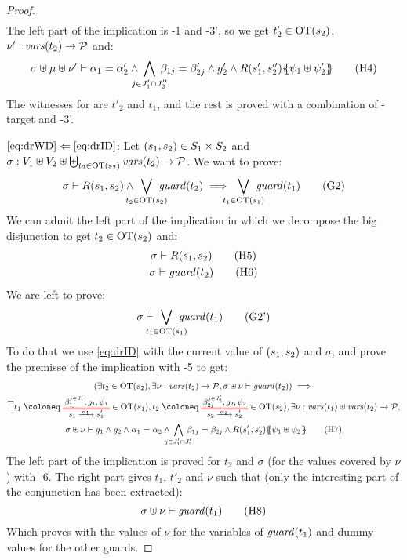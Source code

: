 \documentclass{article}
\begin{document}
\begin{proof}
\begin{multline}
	\end{multline}
	The left part of the implication is \hyp{1} and \hyp{3'}, so we get \(t'_2 \in \mathrm{OT}{\left(s_2\right)}\), \(\nu': \mathit{vars}{\left(t_2\right)} \to \mathcal{P}\) and:
	\[ \sigma \uplus \mu \uplus \nu' \vdash \alpha_1 = \alpha'_2 \wedge \bigwedge_\subbox{j \in J'_1 \cap J''_2} \beta_{1j} = \beta'_{2j} \wedge g'_2 \wedge R\mpar{s'_1, s''_2}\psubst{\psi_1 \uplus \psi'_2} \hyp{4} \]
	The witnesses for  are \(t'_2\) and \(t_1\), and the rest is proved with a combination of \hyp{target} and \hyp{3'}.
\item[\(\eqref{eq:drWD}\Leftarrow\eqref{eq:drID}\):]
	Let \({\left(s_1, s_2\right)} \in S_1 \times S_2\) and \(\sigma: V_1 \uplus V_2 \uplus \biguplus_{t_2 \in \mathrm{OT}{\left(s_2\right)}} \mathit{vars}{\left(t_2\right)} \to \mathcal{P}\).
	We want to prove:
	\[ \sigma \vdash R\mpar{s_1, s_2} \wedge \bigvee_\subbox{t_2 \in \fOT{s_2}} \fguard{t_2} \implies \bigvee_\subbox{t_1 \in \fOT{s_1}} \fguard{t_1} \goal{2} \]
	We can admit the left part of the implication in which we decompose the big disjunction to get \(t_2 \in \mathrm{OT}{\left(s_2\right)}\) and:\\
	\begin{gather}
		\sigma \vdash R\mpar{s_1, s_2} \hyp{5} \\
		\sigma \vdash \fguard{t_2} \hyp{6}
	\end{gather}
	We are left to prove:
	\[ \sigma \vdash \bigvee_\subbox{t_1 \in \fOT{s_1}} \fguard{t_1} \goal{2'} \]
	To do that we use \eqref{eq:drID} with the current value of \({\left(s_1, s_2\right)}\) and \(\sigma\), and prove the premisse of the implication with \hyp{5} to get:
	\begin{multline}
		\mpar{\exists t_2 \in \fOT{s_2}, \exists \nu: \fvars{t_2} \to \values, \sigma \uplus \nu \vdash \fguard{t_2}} \implies \\
		\bigsymb{\exists} t_1 \defobject \OTx{1}{}{1}{1} \in \fOT{s_1}, t_2 \defobject \OTx{2}{}{2}{2} \in \fOT{s_2}, \exists \nu: \fvars{t_1} \uplus \fvars{t_2} \to \values, \\
		\sigma \uplus \nu \vdash g_1 \wedge g_2 \wedge \alpha_1 = \alpha_2 \wedge \bigwedge_\subbox{j \in J'_1 \cap J'_2} \beta_{1j} = \beta_{2j} \wedge R\mpar{s'_1, s'_2}\psubst{\psi_1 \uplus \psi_2} \hyp{7}
	\end{multline}
	The left part of the implication is proved for \(t_2\) and \(\sigma\) (for the values covered by \(\nu\)) with \hyp{6}.
	The right part gives \(t_1\), \(t'_2\) and \(\nu\) such that (only the interesting part of the conjunction has been extracted):
	\[ \sigma \uplus \nu \vdash \fguard{t_1} \hyp{8} \]
	Which proves  with the values of \(\nu\) for the variables of \(\mathit{guard}{\left(t_1\right)}\) and dummy values for the other guards.
\end{proof}
\end{document}
